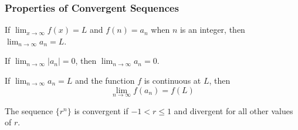 \subsubsection*{Properties of Convergent Sequences}
\begin{theorem}
    If \(\displaystyle{\lim_{x\to\infty}f(x)=L}\) and \(f(n)=a_n\) when \(n\) is an integer,
    then \(\displaystyle{\lim_{n\to\infty}a_n=L}\).
\end{theorem}
\begin{theorem}
    If \(\displaystyle{\lim_{n\to\infty}|a_n|=0}\), then
    \(\displaystyle{\lim_{n\to\infty}a_n=0}\).
\end{theorem}
\begin{theorem}
    If \(\displaystyle{\lim_{n\to\infty}a_n=L}\) and the function \(f\) is continuous at
    \(L\), then
    \[\lim_{n\to\infty}f(a_n)=f(L)\]
\end{theorem}
The sequence \(\{r^n\}\) is convergent if \(-1<r\leq 1\) and divergent for all
other values of \(r\).

